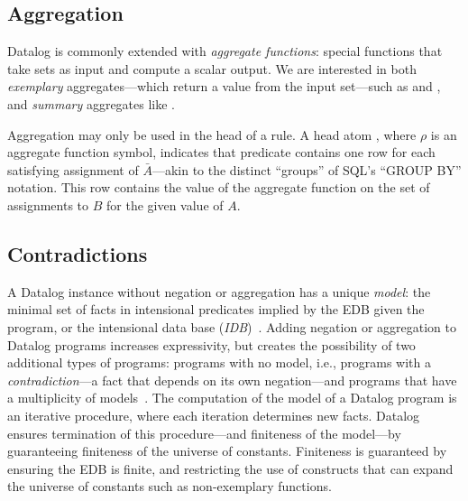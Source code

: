 \subsection{Aggregation}

Datalog is commonly extended with {\em aggregate functions}: special
functions that take sets as input and compute a scalar output.  We are interested in both
{\em exemplary} aggregates---which return a value from the input set---such
as  and , and {\em summary} aggregates like
.


Aggregation may only be used in the head of a rule.  A head atom
, where $\rho$ is an aggregate function symbol,
indicates that predicate  contains one row for each satisfying
assignment of $\bar{A}$---akin to the distinct ``groups'' of SQL's ``GROUP
BY'' notation.  This row contains the value of the aggregate function on the
set of assignments to $B$ for the given value of $A$.

\subsection{Contradictions}

A Datalog instance without negation or aggregation has a unique {\em model}: the
minimal set of facts in intensional predicates implied by the EDB given the
program, or the intensional data base ({\em IDB})~\cite{ullmanbook}.  Adding
negation or aggregation to Datalog programs increases expressivity, but creates
the possibility of two additional types of programs: programs with no model,
i.e., programs with a {\em contradiction}---a fact that depends on its own
negation---and programs that have a multiplicity of
models~\cite{sacca-zaniolo}.  The computation of the model of a Datalog program
is an iterative procedure, where each iteration determines new facts.  Datalog
ensures termination of this procedure---and finiteness of the model---by
guaranteeing finiteness of the universe of constants.  Finiteness is guaranteed
by ensuring the EDB is finite, and restricting the use of constructs that can
expand the universe of constants such as non-exemplary functions.

